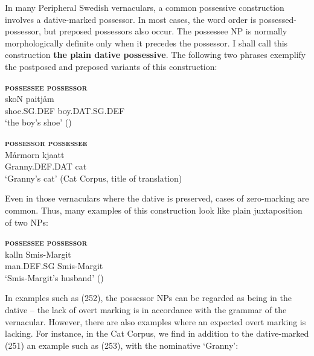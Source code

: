 In many Peripheral Swedish vernaculars, a common possessive construction involves a dative-marked possessor. In most cases, the word order is possessed-possessor, but preposed possessors also occur. The possessee NP is normally morphologically definite only when it precedes the possessor. I shall call this construction \textbf{the plain dative possessive}. The following two phrases exemplify the postposed and preposed variants of this construction:


\ea\label{}
\gll \textbf{\textsc{possessee}} \textbf{\textsc{possessor}} \\
\gll skoN  paitjåm  \\
shoe.SG.DEF  boy.DAT.SG.DEF  \\
\glt ‘the boy’s shoe’ (\citet[22]{Marklund1976})
\z

\ea\label{}
\gll \textbf{\textsc{possessor}} \textbf{\textsc{possessee}} \\
\gll Mårmorn  kjaatt\\
Granny.DEF.DAT  cat\\
\glt ‘Granny’s cat’ (Cat Corpus, title of translation)
\z

Even in those vernaculars where the dative is preserved, cases of zero-marking are common. Thus, many examples of this construction look like plain juxtaposition of two NPs:


\ea\label{}
\gll \textbf{\textsc{possessee}} \textbf{\textsc{possessor}} \\
\gll kalln  Smis-Margit \\
man.DEF.SG  Smis-Margit\\
\glt ‘Smis-Margit’s husband’ (\citet[97]{Levander1909})
\z

In examples such as (252), the possessor NPs can be regarded as being in the dative – the lack of overt marking is in accordance with the grammar of the vernacular. However, there are also examples where an expected overt marking is lacking. For instance, in the Cat Corpus, we find in addition to the dative-marked (251) an example such as (253), with the nominative  ‘Granny’: 

